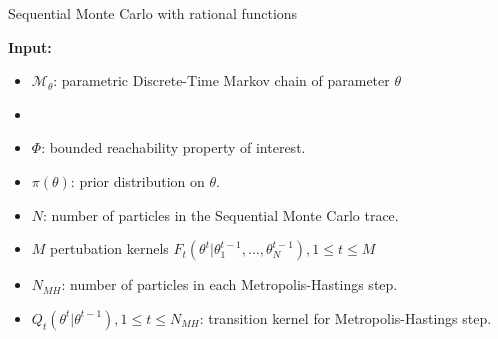 \begin{algorithm}[H]
      \caption{Sequential Monte Carlo with rational functions}
      \label{alg:rf-smc}
      \footnotesize{
            \hspace*{\algorithmicindent} \textbf{Input:}
            \begin{itemize}
                  \item $\mathcal{M}_\theta$: parametric Discrete-Time Markov chain of parameter $\theta$
                  \item
                  \item $\Phi$: bounded reachability property of interest.
                  \item $\pi(\theta)$: prior distribution on $\theta$.
                  \item $N$: number of particles in the Sequential Monte Carlo trace.
                  \item $M$ pertubation kernels $F_t(\theta^t | \theta^{t-1}_1,\ldots,\theta^{t-1}_N), 1\leq t \leq M$
                  \item $N_{MH}$: number of particles in each Metropolis-Hastings step.
                  \item $Q_t(\theta^t|\theta^{t-1}), 1 \leq t \leq N_{MH}$: transition kernel for Metropolis-Hastings step.


\end{itemize}}
\end{algorithm}
